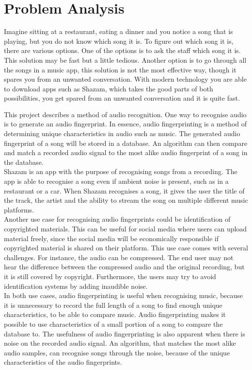 \chapter{Problem Analysis}
Imagine sitting at a restaurant, eating a dinner and you notice a song that is playing, but you do not know which song it is. To figure out which song it is, there are various options. One of the options is to ask the staff which song it is. This solution may be fast but a little tedious. Another option is to go through all the songs in a music app, this solution is not the most effective way, though it spares you from an unwanted conversation. With modern technology you are able to download apps such as Shazam, which takes the good parts of both possibilities, you get spared from an unwanted conversation and it is quite fast.


\noindent This project describes a method of audio recognition. One way to recognise audio is to generate an audio fingerprint. In essence, audio fingerprinting is a method of determining unique characteristics in audio such as music. The generated audio fingerprint of a song will be stored in a database. An algorithm can then compare and match a recorded audio signal to the most alike audio fingerprint of a song in the database.\\ %
\indent Shazam is an app with the purpose of recognising songs from a recording. The app is able to recognise a song even if ambient noise is present, such as in a restaurant or a car. When Shazam recognises a song, it gives the user the title of the track, the artist and the ability to stream the song on multiple different music platforms. \cite{ShazamDescription} \\
\indent Another use case for recognising audio fingerprints could be identification of copyrighted materials. This can be useful for social media where users can upload material freely, since the social media will be economically responsible if copyrighted material is shared on their platform. This use case comes with several challenges. For instance, the audio can be compressed. The end user may not hear the difference between the compressed audio and the original recording, but it is still covered by copyright. Furthermore, the users may try to avoid identification systems by adding inaudible noise. \cite{haitsma2003highly}\\
\indent In both use cases, audio fingerprinting is useful when recognising music, because it is unnecessary to record the full length of a song to find enough unique characteristics, to be able to compare music. Audio fingerprinting makes it possible to use characteristics of a small portion of a song to compare the database to. 
The usefulness of audio fingerprinting is also apparent when there is noise on the recorded audio signal. An algorithm, that matches the most alike audio samples, can recognise songs through the noise, because of the unique characteristics of the audio fingerprints. 


